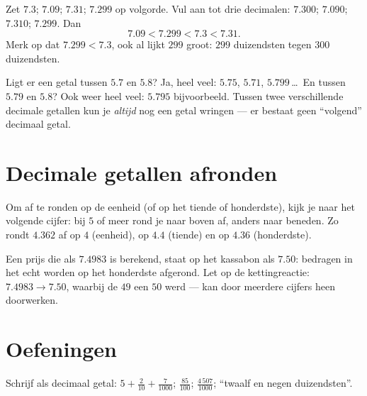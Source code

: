 \begin{example}\label{ex:g5:decimals:order}
Zet $7.3$; $7.09$; $7.31$; $7.299$ op volgorde. Vul aan tot drie
decimalen: $7.300$; $7.090$; $7.310$; $7.299$. Dan
\[
7.09 < 7.299 < 7.3 < 7.31 .
\]
Merk op dat $7.299 < 7.3$, ook al lijkt $299$ groot: $299$ duizendsten
tegen $300$ duizendsten.
\end{example}

\begin{example}\label{ex:g5:decimals:between}
Ligt er een getal tussen $5.7$ en $5.8$? Ja, heel veel: $5.75$, $5.71$,
$5.799$\,\dots\ En tussen $5.79$ en $5.8$? Ook weer heel veel: $5.795$
bijvoorbeeld. Tussen twee verschillende decimale getallen kun je
\emph{altijd} nog een getal wringen --- er bestaat geen ``volgend''
decimaal getal.
\end{example}

\section{Decimale getallen afronden}

\begin{definition}[Afronden]\label{def:g5:decimals:round}
Om af te ronden op de eenheid (of op het tiende of honderdste), kijk je naar
het volgende cijfer: bij $5$ of meer rond je naar boven af, anders naar
beneden. Zo rondt $4.362$ af op $4$ (eenheid), op $4.4$ (tiende) en op
$4.36$ (honderdste).
\end{definition}

\begin{example}\label{ex:g5:decimals:money}
Een prijs die als $7.4983$ is berekend, staat op het kassabon als $7.50$:
bedragen in het echt worden op het honderdste afgerond. Let op de
kettingreactie: $7.4983 \to 7.50$, waarbij de $49$ een $50$ werd ---
 kan door meerdere cijfers heen doorwerken.
\end{example}

\section{Oefeningen}

\begin{exercise}[$\star$]\label{exo:g5:decimals:1}
Schrijf als decimaal getal: $5 + \frac{2}{10} + \frac{7}{1000}$;
\quad $\frac{85}{100}$; \quad $\frac{4\,507}{1000}$; \quad ``twaalf en
negen duizendsten''.
\end{exercise}

